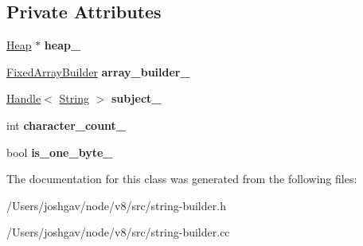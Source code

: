 \subsection*{Private Attributes}
\begin{DoxyCompactItemize}
\item 
\hyperlink{classv8_1_1internal_1_1_heap}{Heap} $\ast$ {\bfseries heap\+\_\+}\hypertarget{classv8_1_1internal_1_1_replacement_string_builder_acb5d2b4d2668ef9472e720cf3a33a778}{}\label{classv8_1_1internal_1_1_replacement_string_builder_acb5d2b4d2668ef9472e720cf3a33a778}

\item 
\hyperlink{classv8_1_1internal_1_1_fixed_array_builder}{Fixed\+Array\+Builder} {\bfseries array\+\_\+builder\+\_\+}\hypertarget{classv8_1_1internal_1_1_replacement_string_builder_aefafa9a36e1c54541670540cdb6a4712}{}\label{classv8_1_1internal_1_1_replacement_string_builder_aefafa9a36e1c54541670540cdb6a4712}

\item 
\hyperlink{classv8_1_1internal_1_1_handle}{Handle}$<$ \hyperlink{classv8_1_1internal_1_1_string}{String} $>$ {\bfseries subject\+\_\+}\hypertarget{classv8_1_1internal_1_1_replacement_string_builder_a737bbb353ce756f4a24e36dff8680dd4}{}\label{classv8_1_1internal_1_1_replacement_string_builder_a737bbb353ce756f4a24e36dff8680dd4}

\item 
int {\bfseries character\+\_\+count\+\_\+}\hypertarget{classv8_1_1internal_1_1_replacement_string_builder_a2fce778b5bac2b1a196b6eb791895523}{}\label{classv8_1_1internal_1_1_replacement_string_builder_a2fce778b5bac2b1a196b6eb791895523}

\item 
bool {\bfseries is\+\_\+one\+\_\+byte\+\_\+}\hypertarget{classv8_1_1internal_1_1_replacement_string_builder_a617f58fb28dc375c3b0d110b403ea571}{}\label{classv8_1_1internal_1_1_replacement_string_builder_a617f58fb28dc375c3b0d110b403ea571}

\end{DoxyCompactItemize}


The documentation for this class was generated from the following files\+:\begin{DoxyCompactItemize}
\item 
/\+Users/joshgav/node/v8/src/string-\/builder.\+h\item 
/\+Users/joshgav/node/v8/src/string-\/builder.\+cc\end{DoxyCompactItemize}
